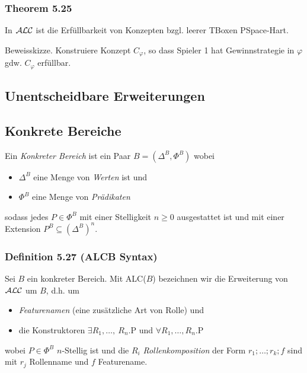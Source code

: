\subsubsection{Theorem 5.25}\label{theorem-5.25}

In $\mathcal{A}\mathcal{L}\mathcal{C}$ ist die Erfüllbarkeit von Konzepten bzgl. leerer TBoxen
PSpace-Hart.

Beweisskizze. Konstruiere Konzept $C_{\varphi}$, so dass Spieler 1 hat
Gewinnstrategie in $\varphi$ gdw. $C_{\varphi}$ erfüllbar.

\subsection{Unentscheidbare
Erweiterungen}\label{unentscheidbare-erweiterungen}

\subsection{Konkrete Bereiche}\label{konkrete-bereiche}

Ein \emph{Konkreter Bereich} ist ein Paar $B = (\Delta^{B},\Phi^{B})$
wobei

\begin{itemize}
\item
  $\Delta^{B}$ eine Menge von \emph{Werten} ist und
\item
  $\Phi^{B}$ eine Menge von \emph{Prädikaten}
\end{itemize}

sodass jedes $P \in \Phi^{B}$ mit einer Stelligkeit $n \geq 0$
ausgestattet ist und mit einer Extension
$P^{B} \subseteq \left( \Delta^{B} \right)^{n}$.

\subsubsection{Definition 5.27 (ALCB
Syntax)}\label{definition-5.27-alcb-syntax}

Sei $B$ ein konkreter Bereich. Mit ALC($B$) bezeichnen wir die
Erweiterung von $\mathcal{A}\mathcal{L}\mathcal{C}$ um $B$, d.h. um

\begin{itemize}
\item
  \emph{Featurenamen} (eine zusätzliche Art von Rolle) und
\item
  die Konstruktoren $\exists R_1,\ldots,\ R_{n}\text{.P}$ und
  $\forall R_1,\ldots,R_{n}\text{.P}$
\end{itemize}

wobei $P \in \Phi^{B}$ $n$-Stellig ist und die $R_{i}$
\emph{Rollenkomposition} der Form $r_1;\ldots;r_{k};f$ sind mit
$r_{j}$ Rollenname und $f$ Featurename.

